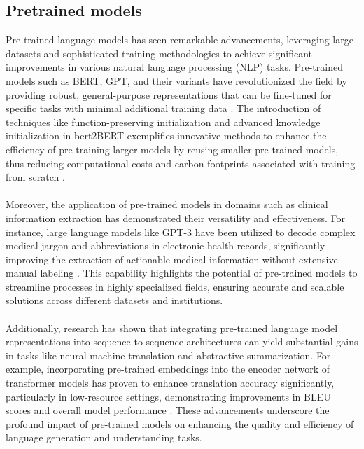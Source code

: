 \subsection*{Pretrained models}
Pre-trained language models has seen remarkable advancements, leveraging large datasets and sophisticated training methodologies to achieve significant improvements in various natural language processing (NLP) tasks. Pre-trained models such as BERT, GPT, and their variants have revolutionized the field by providing robust, general-purpose representations that can be fine-tuned for specific tasks with minimal additional training data \cite{chen-etal-2022-bert2bert}. The introduction of techniques like function-preserving initialization and advanced knowledge initialization in bert2BERT exemplifies innovative methods to enhance the efficiency of pre-training larger models by reusing smaller pre-trained models, thus reducing computational costs and carbon footprints associated with training from scratch \cite{chen-etal-2022-bert2bert}.
\\\\
Moreover, the application of pre-trained models in domains such as clinical information extraction has demonstrated their versatility and effectiveness. For instance, large language models like GPT-3 have been utilized to decode complex medical jargon and abbreviations in electronic health records, significantly improving the extraction of actionable medical information without extensive manual labeling \cite{agrawal2022large}. This capability highlights the potential of pre-trained models to streamline processes in highly specialized fields, ensuring accurate and scalable solutions across different datasets and institutions.
\\\\
Additionally, research has shown that integrating pre-trained language model representations into sequence-to-sequence architectures can yield substantial gains in tasks like neural machine translation and abstractive summarization. For example, incorporating pre-trained embeddings into the encoder network of transformer models has proven to enhance translation accuracy significantly, particularly in low-resource settings, demonstrating improvements in BLEU scores and overall model performance \cite{edunov-etal-2019-pre}. These advancements underscore the profound impact of pre-trained models on enhancing the quality and efficiency of language generation and understanding tasks.
\\\\
